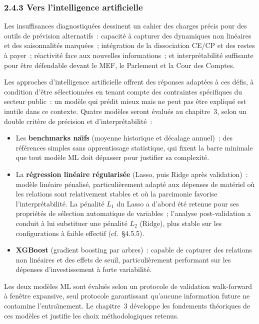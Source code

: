 \subsubsection*{2.4.3 \quad Vers l'intelligence artificielle}

Les insuffisances diagnostiqu\'ees dessinent un cahier des charges pr\'ecis pour des outils de pr\'evision alternatifs~: capacit\'e \`a capturer des dynamiques non lin\'eaires et des saisonnalit\'es marqu\'ees~; int\'egration de la dissociation CE/CP et des restes \`a payer~; r\'eactivit\'e face aux nouvelles informations~; et interpr\'etabilit\'e suffisante pour \^etre d\'efendable devant le MEF, le Parlement et la Cour des Comptes.

Les approches d'intelligence artificielle offrent des r\'eponses adapt\'ees \`a ces d\'efis, \`a condition d'\^etre s\'electionn\'ees en tenant compte des contraintes sp\'ecifiques du secteur public~: un mod\`ele qui pr\'edit mieux mais ne peut pas \^etre expliqu\'e est inutile dans ce contexte. Quatre mod\`eles seront \'evalu\'es au chapitre~3, selon un double crit\`ere de pr\'ecision et d'interpr\'etabilit\'e~:

\begin{itemize}
    \item Les \textbf{benchmarks na\"\i fs} (moyenne historique et d\'ecalage annuel)~: des r\'ef\'erences simples sans apprentissage statistique, qui fixent la barre minimale que tout mod\`ele ML doit d\'epasser pour justifier sa complexit\'e.

    \item La \textbf{r\'egression lin\'eaire r\'egularis\'ee} (Lasso, puis Ridge apr\`es validation)~: mod\`ele lin\'eaire p\'enalis\'e, particuli\`erement adapt\'e aux d\'epenses de mat\'eriel o\`u les relations sont relativement stables et o\`u la parcimonie favorise l'interpr\'etabilit\'e. La p\'enalit\'e $L_1$ du Lasso a d'abord \'et\'e retenue pour ses propri\'et\'es de s\'election automatique de variables~; l'analyse post-validation a conduit \`a lui substituer une p\'enalit\'e $L_2$ (Ridge), plus stable sur les configurations \`a faible effectif (cf.~\S4.5.5).

    \item \textbf{XGBoost} (gradient boosting par arbres)~: capable de capturer des relations non lin\'eaires et des effets de seuil, particulièrement performant sur les d\'epenses d'investissement \`a forte variabilit\'e.
\end{itemize}

Les deux mod\`eles ML sont \'evalu\'es selon un protocole de validation walk-forward \`a fen\^etre expansive, seul protocole garantissant qu'aucune information future ne contamine l'entra\^\i nement. Le chapitre~3 d\'eveloppe les fondements th\'eoriques de ces mod\`eles et justifie les choix m\'ethodologiques retenus.
